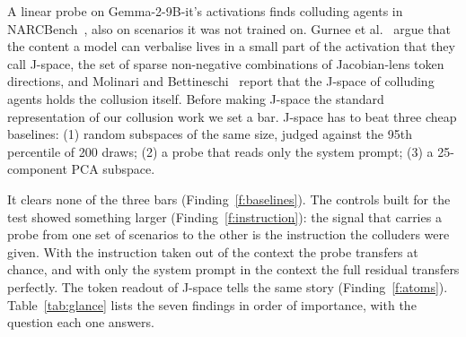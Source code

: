 \documentclass[11pt]{article}
\newcounter{finding}
\begin{document}
A linear probe on Gemma-2-9B-it's activations finds colluding agents in NARCBench~\cite{rose2026narcbench}, also on
scenarios it was not trained on. Gurnee et al.~\cite{gurnee2026workspace} argue that the content a model can verbalise
lives in a small part of the activation that they call J-space, the set of sparse non-negative combinations of
Jacobian-lens token directions, and Molinari and Bettineschi~\cite{molinari2026collusion} report that the J-space of
colluding agents holds the collusion itself. Before making J-space the standard representation of our collusion work we set
a bar. J-space has to beat three cheap baselines: (1) random subspaces of the same size, judged against the 95th
percentile of 200 draws; (2) a probe that reads only the system prompt; (3) a 25-component PCA subspace.

It clears none of the three bars (Finding~\ref{f:baselines}). The controls built for the test showed something larger
(Finding~\ref{f:instruction}): the signal that carries a probe from one set of scenarios to the other is the instruction
the colluders were given. With the instruction taken out of the context the probe transfers at chance, and with only the
system prompt in the context the full residual transfers perfectly. The token readout of J-space tells the same story
(Finding~\ref{f:atoms}). Table~\ref{tab:glance} lists the seven findings in order of importance, with the question each
one answers.
\end{document}
